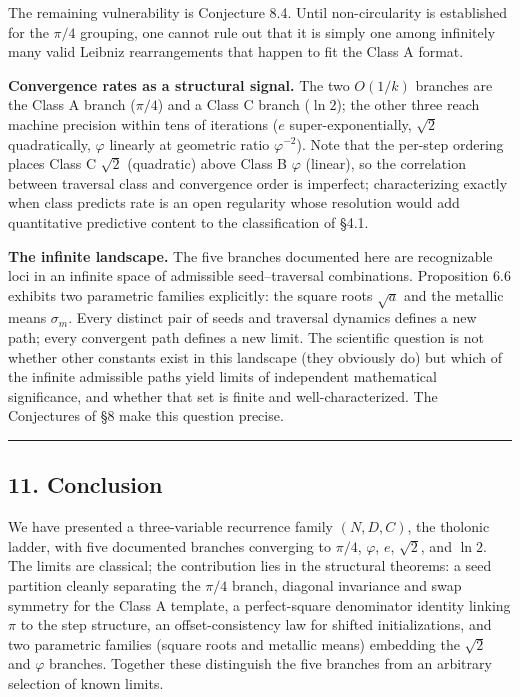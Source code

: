 \documentclass[
  11pt,
  letterpaper,
]{article}
\begin{document}
The remaining vulnerability is Conjecture 8.4. Until non-circularity is
established for the \(\pi/4\) grouping, one cannot rule out that it is
simply one among infinitely many valid Leibniz rearrangements that
happen to fit the Class A format.

\textbf{Convergence rates as a structural signal.} The two \(O(1/k)\)
branches are the Class A branch (\(\pi/4\)) and a Class C branch
(\(\ln 2\)); the other three reach machine precision within tens of
iterations (\(e\) super-exponentially, \(\sqrt{2}\) quadratically,
\(\varphi\) linearly at geometric ratio \(\varphi^{-2}\)). Note that the
per-step ordering places Class C \(\sqrt{2}\) (quadratic) above Class B
\(\varphi\) (linear), so the correlation between traversal class and
convergence order is imperfect; characterizing exactly when class
predicts rate is an open regularity whose resolution would add
quantitative predictive content to the classification of §4.1.

\textbf{The infinite landscape.} The five branches documented here are
recognizable loci in an infinite space of admissible seed--traversal
combinations. Proposition 6.6 exhibits two parametric families
explicitly: the square roots \(\sqrt{a}\) and the metallic means
\(\sigma_m\). Every distinct pair of seeds and traversal dynamics
defines a new path; every convergent path defines a new limit. The
scientific question is not whether other constants exist in this
landscape (they obviously do) but which of the infinite admissible paths
yield limits of independent mathematical significance, and whether that
set is finite and well-characterized. The Conjectures of §8 make this
question precise.

\begin{center}\rule{0.5\linewidth}{0.5pt}\end{center}

\subsection{11. Conclusion}\label{conclusion}

We have presented a three-variable recurrence family \((N, D, C)\), the
tholonic ladder, with five documented branches converging to \(\pi/4\),
\(\varphi\), \(e\), \(\sqrt{2}\), and \(\ln 2\). The limits are
classical; the contribution lies in the structural theorems: a seed
partition cleanly separating the \(\pi/4\) branch, diagonal invariance
and swap symmetry for the Class A template, a perfect-square denominator
identity linking \(\pi\) to the step structure, an offset-consistency
law for shifted initializations, and two parametric families (square
roots and metallic means) embedding the \(\sqrt{2}\) and \(\varphi\)
branches. Together these distinguish the five branches from an arbitrary
selection of known limits.
\end{document}
